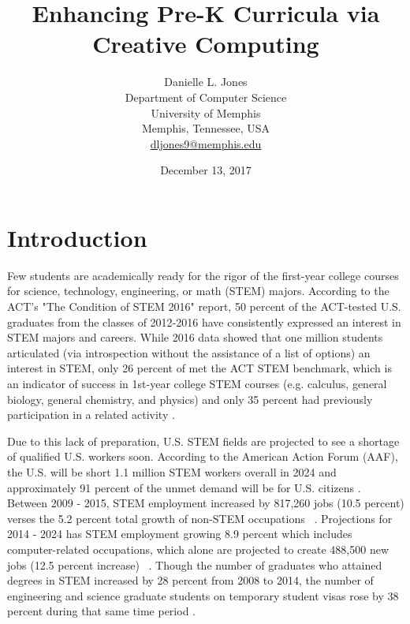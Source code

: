 \documentclass[11pt, letterpaper, onecolumn]{article}
\begin{document}

\title{Enhancing Pre-K Curricula via Creative Computing}

\author{%
Danielle L. Jones\\%
Department of Computer Science\\%
University of Memphis\\%
Memphis, Tennessee, USA\\%
\href{mailto:dljones9@memphis.edu}{dljones9@memphis.edu}%
}

\date{December 13, 2017}

\maketitle



\section{Introduction}

%
Few students are academically ready for the rigor of the first-year college courses for science, technology, engineering, or math (STEM) majors.
%
According to the ACT's "The Condition of STEM 2016" report, 50 percent of the ACT-tested U.S. graduates from the classes of 2012-2016 have consistently expressed an interest in STEM majors and careers. 
%
While 2016 data showed that one million students articulated (via introspection without the assistance of a list of options) an interest in STEM, only 26 percent of met the ACT STEM benchmark, which is an indicator of success in 1st-year college STEM courses (e.g. calculus, general biology, general chemistry, and physics) and only 35 percent had previously participation in a related activity \cite{act2016}.

%
Due to this lack of preparation, U.S. STEM fields are projected to see a shortage of qualified U.S. workers soon.
%
According to the American Action Forum (AAF), the U.S. will be short 1.1 million STEM workers overall in 2024 and approximately 91 percent of the unmet demand will be for U.S. citizens \cite{varas2016}.
%
Between 2009 - 2015,  STEM employment increased by 817,260 jobs (10.5 percent) verses the 5.2 percent total growth of non-STEM occupations ~\cite{fayer2017spotlightstat}.
%
Projections for 2014 - 2024 has STEM employment growing 8.9 percent  which includes computer-related occupations, which alone are projected to create 488,500 new jobs (12.5 percent increase) ~\cite{noonan2017}.
%
Though the number of graduates who attained degrees in STEM increased by 28 percent from 2008 to 2014, the number of engineering and science graduate students on temporary student visas rose by 38 percent during that same time period \cite{nces2015des}.
 
\end{document}
